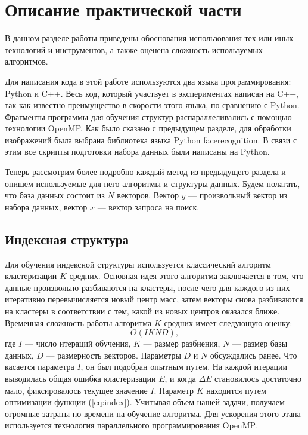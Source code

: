 \section{Описание практической части}
\label{sec:Chapter4} 

В данном разделе работы приведены обоснования использования тех или иных технологий и инструментов, а также оценена сложность используемых алгоритмов.

Для написания кода в этой работе используются два языка программирования: Python и C++. Весь код, который участвует в экспериментах написан на C++, так как известно преимущество в скорости этого языка, по сравнению с Python. Фрагменты программы для обучения структур распараллеливались с помощью технологии OpenMP. Как было сказано с предыдущем разделе, для обработки изображений была выбрана библиотека языка Python facerecognition. В связи с этим все скрипты подготовки набора данных были написаны на Python. 

Теперь рассмотрим более подробно каждый метод из предыдущего раздела и опишем используемые для него алгоритмы и структуры данных. Будем полагать, что база данных состоит из $N$ векторов. Вектор $y$ — произвольный вектор из набора данных, вектор $x$ — вектор запроса на поиск.

\subsection{Индексная структура}

Для обучения индексной структуры используется классический алгоритм кластеризации $K$-средних. Основная идея этого алгоритма заключается в том, что данные произвольно разбиваются на кластеры, после чего для каждого из них итеративно перевычисляется новый центр масс, затем векторы снова разбиваются на кластеры в соответствии с тем, какой из новых центров оказался ближе. Временная сложность работы алгоритма $K$-средних имеет следующую оценку: 
\begin{equation}\label{eq:kmeans}
O(IKND),
\end{equation}
где $I$ — число итераций обучения, $K$ — размер разбиения, $N$ — размер базы данных, $D$ — размерность векторов. Параметры $D$ и $N$ обсуждались ранее. Что касается параметра $I$, он был подобран опытным путем. На каждой итерации выводилась общая ошибка кластеризации $E$, и когда $\Delta E$ становилось достаточно мало, фиксировалось текущее значение $I$. Параметр $K$ находится путем оптимизации функции (\ref{eq:index}). Учитывая объем нашей задачи, получаем огромные затраты по времени на обучение алгоритма. Для ускорения этого этапа используется технология параллельного программирования OpenMP.

